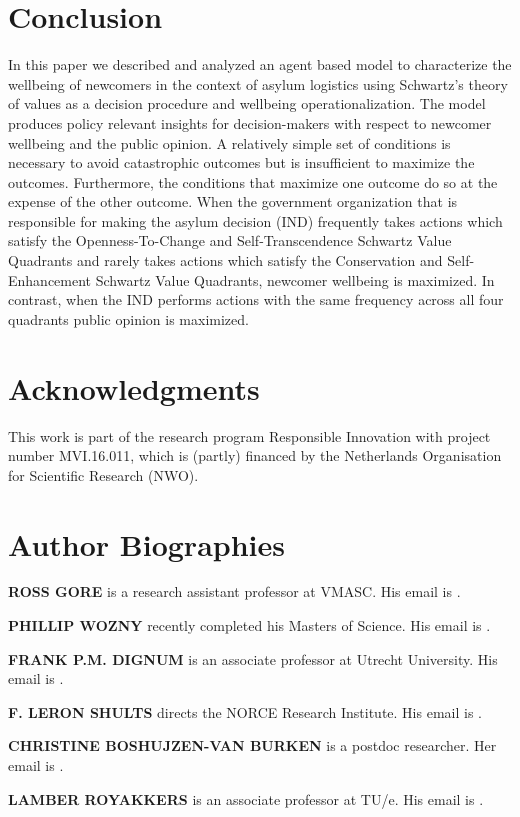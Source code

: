 \documentclass{scspaperproc}
\theoremstyle{scsthe}
\begin{document}
\section{Conclusion}
\label{sec:discussion}
In this paper we described and analyzed an agent based model to characterize the wellbeing of newcomers in the context of asylum logistics using Schwartz's theory of values as a decision procedure and wellbeing operationalization. The model produces policy relevant insights for decision-makers with respect to newcomer wellbeing and the public opinion. A relatively simple set of conditions is necessary to avoid catastrophic outcomes but is insufficient to maximize the outcomes. Furthermore, the conditions that maximize one outcome do so at the expense of the other outcome. When the government organization that is responsible for making the asylum decision (IND) frequently takes actions which satisfy the Openness-To-Change and Self-Transcendence Schwartz Value Quadrants and rarely takes actions which satisfy the Conservation and Self-Enhancement Schwartz Value Quadrants, newcomer wellbeing is maximized. In contrast, when the IND performs actions with the same frequency across all four quadrants public opinion is maximized. 
\section*{Acknowledgments}
This work is part of the research program Responsible Innovation with project number MVI.16.011, which is (partly) financed by the Netherlands Organisation for Scientific Research (NWO). %



\section*{Author Biographies}

\textbf{\uppercase{ROSS GORE}} is a research assistant professor at VMASC. His email is .

\textbf{\uppercase{PHILLIP WOZNY}} recently completed his Masters of Science. His email is . 

\textbf{\uppercase{FRANK P.M. DIGNUM}} is an associate professor at Utrecht University. His email is .

\textbf{\uppercase{F. LERON SHULTS}} directs the NORCE Research Institute. His email is .

\textbf{\uppercase{CHRISTINE BOSHUJZEN-VAN BURKEN}} is a postdoc researcher. Her email is .

\textbf{\uppercase{LAMBER ROYAKKERS}} is an associate professor at TU/e. His email is .
\end{document}
